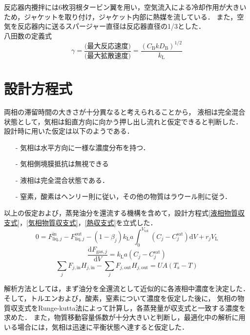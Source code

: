 \documentclass[a4j]{jsreport}
\newcommand{\diff}{\mathrm{d}}
\begin{document}
反応器内攪拌には6枚羽根タービン翼を用い，空気流入による冷却作用が大きいため，ジャケットを取り付け，ジャケット内部に熱媒を流している．
また，空気を反応器内に送るスパージャー直径は反応器直径の1/3とした．\\

八田数の定義式
\begin{equation}
    \gamma = \frac{\text{(最大反応速度)}}{\text{(最大拡散速度)}} = \frac{(C_\mathrm{B} k D_\mathrm{B})^{1/2}}{k_\mathrm{L}}
\end{equation}

\section{設計方程式}
両相の滞留時間の大きさが十分異なると考えられることから，
液相は完全混合状態として，気相は鉛直方向に向かう押し出し流れと仮定できると判断した．
設計時に用いた仮定は以下のようである．
\begin{itemize}
    \item[-] 気相は水平方向に一様な濃度分布を持つ．
    \item[-] 気相側境膜抵抗は無視できる
    \item[-] 液相は完全混合状態である．
    \item[-] 窒素，酸素はヘンリー則に従い，その他の物質はラウール則に従う．
\end{itemize}
以上の仮定および，蒸発油分を還流する機構を含めて，設計方程式\eqref{液相物質収支式}，\eqref{気相物質収支式}，\eqref{熱収支式}を立式した．
\begin{equation}
    \label{液相物質収支式}
    0 = F^\text{in}_{\text{liq},j} - F^\text{out}_{\text{liq},j} - (1 - \beta_j) k_\mathrm{L} a \int^{V_\text{tot}}_0(C_j - C^\text{sat}_j) \diff V + r_j V_\mathrm{L}
\end{equation}
\begin{equation}
    \label{気相物質収支式}
    \frac{\diff F_{\text{gas},j}}{\diff V} = k_\mathrm{L} a (C_j - C^\text{sat}_j)
\end{equation}
\begin{equation}
    \label{熱収支式}
    \sum_jF_{j,\mathrm{in}}H_{j,\mathrm{in}}-\sum_jF_{j,\text{out}}H_{j,\text{out}} = UA(T_\mathrm{s}-T)
\end{equation}

解析方法としては，まず油分を全還流として近似的に各液相中濃度を決定した．そして，トルエンおよび，酸素，窒素について濃度を仮定した後に，
気相の物質収支式をRunge-kutta法によって計算し，各蒸発量が収支式と一致する濃度を求めた．
また，物質移動容量係数が十分大きいと判断し，最適化中の解析に用いる場合には，気相は迅速に平衡状態へ達すると仮定した．
\end{document}
